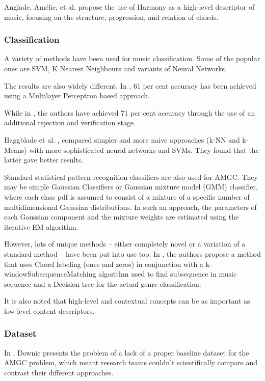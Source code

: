 Anglade, Amélie, et al.\cite{Anglade2010} propose the use of Harmony as a high-level descriptor of music, focusing on the structure, progression, and relation of chords.

\subsubsection{Classification}

A variety of methods have been used for music classification. Some of the popular ones are SVM, K Nearest Neighbours and variants of Neural Networks.

The results are also widely different. In \cite{Neumayer2004}, 61 per cent accuracy has been achieved using a Multilayer Perceptron based approach. 

While in \cite{Koerich2013}, the authors have achieved 71 per cent accuracy through the use of an additional rejection and verification stage.

Haggblade et al. \cite{Haggblade2011}, compared simpler and more naive approaches (k-NN and k-Means) with more sophisticated neural networks and SVMs. 
They found that the latter gave better results.

Standard statistical pattern recognition classifiers are also used for AMGC.
They may be simple Gaussian Classifiers or Gaussian mixture model (GMM) classifier, where each class pdf is assumed to consist of a mixture of a specific number of multidimensional Gaussian distributions.
In such an approach, the parameters of each Gaussian component and the mixture weights are estimated using the iterative EM algorithm.

However, lots of unique methods -- either completely novel or a variation of a standard method -- have been put into use too. In \cite{Nasridinov2014}, the authors
propose a method that uses Chord labeling (ones and zeros) in conjunction with a k-windowSubsequenceMatching algorithm used to find subsequence in music sequence
and a Decision tree for the actual genre classification.

It is also noted that high-level and contextual concepts can be as important as low-level content descriptors. \cite{Anglade2010} 

\subsubsection{Dataset}

In \cite{Downie2003}, Downie presents the problem of a lack of a proper baseline dataset for the AMGC problem, which meant research teams couldn't scientifically compare and contrast their different approaches.

